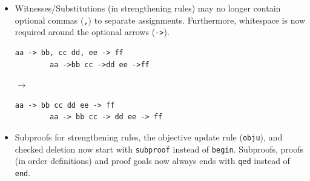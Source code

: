\documentclass[a4paper]{article}
\newcommand{\veriPB}[0]{\textsc{VeriPB}}
\begin{document}
\begin{itemize}
	      \begin{minipage}[t]{.05\linewidth}
		      \centering \vspace*{-5mm}$\to$
	      \end{minipage}\hfill%
	      \hfill%
	      \begin{minipage}{.47\linewidth}
		      \begin{lstlisting}[language=veripb, gobble=8, rulecolor=\color{veripb-valid-text}, caption={\veriPB{} 3.0 syntax.}]
		red +1 ~r1 +1 x1 >= 1 : r1 -> 0;
		e +1 ~r1 +1 x1 >= 1 : -1;
		\end{lstlisting}
	      \end{minipage}
	\item Witnesses/Substitutions (in strengthening rules) may no longer contain optional commas (\verb!,!) to separate assignments. Furthermore, whitespace is now required around the optional arrows (\verb!->!).
	      \\[1mm]
	      \begin{minipage}{.47\linewidth}
		      \begin{lstlisting}[language=veripb, gobble=8, rulecolor=\color{veripb-invalid-text}, caption={\veriPB{} 2.0 syntax.}]
		aa -> bb, cc dd, ee -> ff
		aa ->bb cc ->dd ee ->ff
		\end{lstlisting}
	      \end{minipage}\hfill%
	      \begin{minipage}[t]{.05\linewidth}
		      \centering \vspace*{-5mm}$\to$
	      \end{minipage}\hfill%
	      \hfill%
	      \begin{minipage}{.47\linewidth}
		      \begin{lstlisting}[language=veripb, gobble=8, rulecolor=\color{veripb-valid-text}, caption={\veriPB{} 3.0 syntax.}]
		aa -> bb cc dd ee -> ff
		aa -> bb cc -> dd ee -> ff
		\end{lstlisting}
	      \end{minipage}
	\item Subproofs for strengthening rules, the objective update rule (\lstinline[language=veripb]!obju!), and checked deletion now start with \lstinline[language=veripb]!subproof! instead of \lstinline[language=veripb]!begin!. Subproofs, proofs (in order definitions) and proof goals now always ends with \lstinline[language=veripb]!qed! instead of \lstinline[language=veripb]!end!.
	      \\[1mm]
	      \begin{minipage}{.47\linewidth}

\end{minipage}
\end{itemize}
\end{document}
